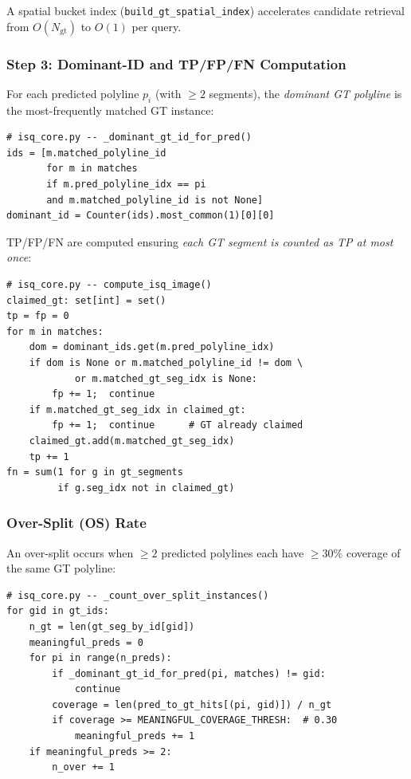 \documentclass[11pt,a4paper]{article}
\begin{document}
A spatial bucket index (\texttt{build\_gt\_spatial\_index}) accelerates candidate
retrieval from $O(N_{\text{gt}})$ to $O(1)$ per query.

\subsubsection{Step 3: Dominant-ID and TP/FP/FN Computation}

For each predicted polyline $p_i$ (with $\geq 2$ segments), the
\emph{dominant GT polyline} is the most-frequently matched GT instance:

\begin{lstlisting}
# isq_core.py -- _dominant_gt_id_for_pred()
ids = [m.matched_polyline_id
       for m in matches
       if m.pred_polyline_idx == pi
       and m.matched_polyline_id is not None]
dominant_id = Counter(ids).most_common(1)[0][0]
\end{lstlisting}

TP/FP/FN are computed ensuring \emph{each GT segment is counted as TP at most once}:

\begin{lstlisting}
# isq_core.py -- compute_isq_image()
claimed_gt: set[int] = set()
tp = fp = 0
for m in matches:
    dom = dominant_ids.get(m.pred_polyline_idx)
    if dom is None or m.matched_polyline_id != dom \
            or m.matched_gt_seg_idx is None:
        fp += 1;  continue
    if m.matched_gt_seg_idx in claimed_gt:
        fp += 1;  continue      # GT already claimed
    claimed_gt.add(m.matched_gt_seg_idx)
    tp += 1
fn = sum(1 for g in gt_segments
         if g.seg_idx not in claimed_gt)
\end{lstlisting}

\subsubsection{Over-Split (OS) Rate}

An over-split occurs when $\geq 2$ predicted polylines each have
$\geq 30\%$ coverage of the same GT polyline:

\begin{lstlisting}
# isq_core.py -- _count_over_split_instances()
for gid in gt_ids:
    n_gt = len(gt_seg_by_id[gid])
    meaningful_preds = 0
    for pi in range(n_preds):
        if _dominant_gt_id_for_pred(pi, matches) != gid:
            continue
        coverage = len(pred_to_gt_hits[(pi, gid)]) / n_gt
        if coverage >= MEANINGFUL_COVERAGE_THRESH:  # 0.30
            meaningful_preds += 1
    if meaningful_preds >= 2:
        n_over += 1
\end{lstlisting}
\end{document}
